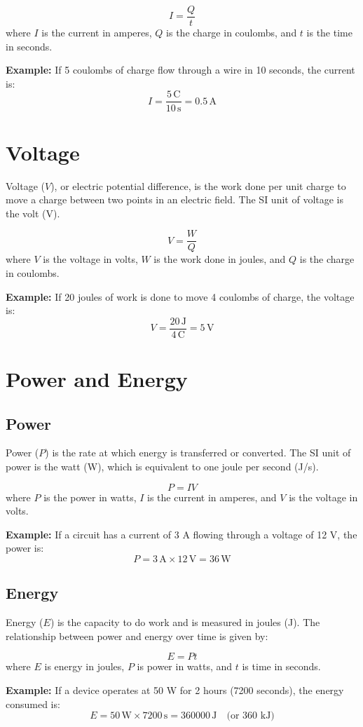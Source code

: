 \documentclass[openany]{book}
\begin{document}
\[
    I = \frac{Q}{t}
\]
where \(I\) is the current in amperes, \(Q\) is the charge in coulombs, and \(t\) is the time in seconds.

\textbf{Example:} If 5 coulombs of charge flow through a wire in 10 seconds, the current is:
\[
    I = \frac{5 \, \text{C}}{10 \, \text{s}} = 0.5 \, \text{A}
\]

\section{Voltage}
Voltage ($V$), or electric potential difference, is the work done per unit charge to move a charge between two points in an electric field. The SI unit of voltage is the volt (V).

\[
    V = \frac{W}{Q}
\]
where \(V\) is the voltage in volts, \(W\) is the work done in joules, and \(Q\) is the charge in coulombs.

\textbf{Example:} If 20 joules of work is done to move 4 coulombs of charge, the voltage is:
\[
    V = \frac{20 \, \text{J}}{4 \, \text{C}} = 5 \, \text{V}
\]

\section{Power and Energy}
\subsection{Power}
Power ($P$) is the rate at which energy is transferred or converted. The SI unit of power is the watt (W), which is equivalent to one joule per second (J/s).

\[
    P = IV
\]
where \(P\) is the power in watts, \(I\) is the current in amperes, and \(V\) is the voltage in volts.

\textbf{Example:} If a circuit has a current of 3 A flowing through a voltage of 12 V, the power is:
\[
    P = 3 \, \text{A} \times 12 \, \text{V} = 36 \, \text{W}
\]

\subsection{Energy}
Energy ($E$) is the capacity to do work and is measured in joules (J). The relationship between power and energy over time is given by:

\[
    E = Pt
\]
where \(E\) is energy in joules, \(P\) is power in watts, and \(t\) is time in seconds.

\textbf{Example:} If a device operates at 50 W for 2 hours (7200 seconds), the energy consumed is:
\[
    E = 50 \, \text{W} \times 7200 \, \text{s} = 360000 \, \text{J} \quad \text{(or 360 kJ)}
\]
\end{document}
